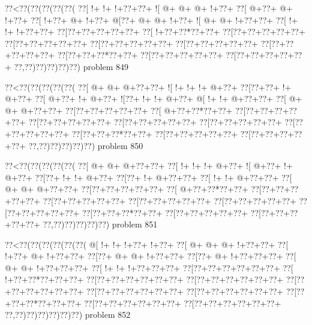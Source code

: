 \vbox{\vbox{\goo
\0??<\0??(\0??(\0??(\0??(\0??(
\0??[\- !+\- !+\- !+\0??+\0??+
\- ![\- @+\- @+\- @+\- !+\0??+
\0??[\- @+\0??+\- @+\- !+\0??+
\0??[\- !+\0??+\- @+\- !+\0??+
\- @[\0??+\- @+\- @+\- !+\0??+
\- ![\- @+\- @+\- !+\0??+\0??+
\0??[\- !+\- !+\- !+\0??+\0??+
\0??[\0??+\0??+\0??+\0??+\0??+
\0??[\- !+\0??+\0??*\0??+\0??+
\0??[\0??+\0??+\0??+\0??+\0??+
\0??[\0??+\0??+\0??+\0??+\0??+
\0??[\0??+\0??+\0??+\0??+\0??+
\0??[\0??+\0??+\0??+\0??+\0??+
\0??[\0??+\0??+\0??+\0??+\0??+
\0??[\0??+\0??+\0??*\0??+\0??+
\0??[\0??+\0??+\0??+\0??+\0??+
\0??[\0??+\0??+\0??+\0??+\0??+
\0??,\0??)\0??)\0??)\0??)\0??)
}
\hfil problem 849\hfil\break
}

\vbox{\vbox{\goo
\0??<\0??(\0??(\0??(\0??(\0??(
\0??[\- @+\- @+\- @+\0??+\0??+
\- ![\- !+\- !+\- !+\- @+\0??+
\0??[\0??+\0??+\- !+\- @+\0??+
\0??[\- @+\0??+\- !+\- @+\0??+
\- ![\0??+\- !+\- !+\- @+\0??+
\- @[\- !+\- !+\- @+\0??+\0??+
\0??[\- @+\- @+\- @+\0??+\0??+
\0??[\0??+\0??+\0??+\0??+\0??+
\0??[\- @+\0??+\0??*\0??+\0??+
\0??[\0??+\0??+\0??+\0??+\0??+
\0??[\0??+\0??+\0??+\0??+\0??+
\0??[\0??+\0??+\0??+\0??+\0??+
\0??[\0??+\0??+\0??+\0??+\0??+
\0??[\0??+\0??+\0??+\0??+\0??+
\0??[\0??+\0??+\0??*\0??+\0??+
\0??[\0??+\0??+\0??+\0??+\0??+
\0??[\0??+\0??+\0??+\0??+\0??+
\0??,\0??)\0??)\0??)\0??)\0??)
}
\hfil problem 850\hfil\break
}

\vbox{\vbox{\goo
\0??<\0??(\0??(\0??(\0??(\0??(
\0??[\- @+\- @+\- @+\0??+\0??+
\0??[\- !+\- !+\- !+\- @+\0??+
\- ![\- @+\0??+\- !+\- @+\0??+
\0??[\0??+\- !+\- !+\- @+\0??+
\0??[\0??+\- !+\- @+\0??+\0??+
\0??[\- !+\- !+\- @+\0??+\0??+
\0??[\- @+\- @+\- @+\0??+\0??+
\0??[\0??+\0??+\0??+\0??+\0??+
\0??[\- @+\0??+\0??*\0??+\0??+
\0??[\0??+\0??+\0??+\0??+\0??+
\0??[\0??+\0??+\0??+\0??+\0??+
\0??[\0??+\0??+\0??+\0??+\0??+
\0??[\0??+\0??+\0??+\0??+\0??+
\0??[\0??+\0??+\0??+\0??+\0??+
\0??[\0??+\0??+\0??*\0??+\0??+
\0??[\0??+\0??+\0??+\0??+\0??+
\0??[\0??+\0??+\0??+\0??+\0??+
\0??,\0??)\0??)\0??)\0??)\0??)
}
\hfil problem 851\hfil\break
}

\vbox{\vbox{\goo
\0??<\0??(\0??(\0??(\0??(\0??(\0??(
\- @[\- !+\- !+\- !+\0??+\- !+\0??+
\0??[\- @+\- @+\- @+\- !+\0??+\0??+
\0??[\- !+\0??+\- @+\- !+\0??+\0??+
\0??[\0??+\- @+\- @+\- !+\0??+\0??+
\0??[\0??+\- @+\- !+\0??+\0??+\0??+
\0??[\- @+\- @+\- !+\0??+\0??+\0??+
\0??[\- !+\- !+\- !+\0??+\0??+\0??+
\0??[\0??+\0??+\0??+\0??+\0??+\0??+
\0??[\- !+\0??+\0??*\0??+\0??+\0??+
\0??[\0??+\0??+\0??+\0??+\0??+\0??+
\0??[\0??+\0??+\0??+\0??+\0??+\0??+
\0??[\0??+\0??+\0??+\0??+\0??+\0??+
\0??[\0??+\0??+\0??+\0??+\0??+\0??+
\0??[\0??+\0??+\0??+\0??+\0??+\0??+
\0??[\0??+\0??+\0??*\0??+\0??+\0??+
\0??[\0??+\0??+\0??+\0??+\0??+\0??+
\0??[\0??+\0??+\0??+\0??+\0??+\0??+
\0??,\0??)\0??)\0??)\0??)\0??)\0??)
}
\hfil problem 852\hfil\break
}

